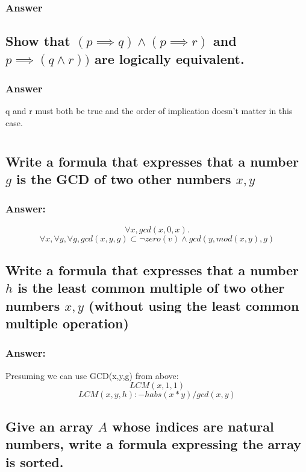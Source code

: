 \documentclass[titlepage]{article}\usepackage[]{graphicx}\usepackage[]{color}
\begin{document}
  \subsubsection{Answer}
  

  \subsection{ Show that $ ( p \implies q ) \land ( p \implies r ) $ and 
              $ p \implies (q \land r))$ are logically equivalent.}
  \subsubsection{Answer}
  q and r must both be true and the order of implication doesn't matter in this
  case. 


  \section{}
  \subsection{Write a formula that expresses that a number $g$ is the GCD of
    two other numbers $x,y$}
  \subsubsection{Answer:}
  \[ \forall x, gcd(x, 0, x). \]
  \[ \forall x, \forall y, \forall g, gcd(x, y, g) ⊂ \lnot zero(v) ∧ gcd(y, mod(x, y), g)  \]

  \subsection{Write a formula that expresses that a number $h$ is the least
    common multiple of two other numbers $x,y$ (without using the least common
    multiple operation)}
  \subsubsection{Answer:}
  Presuming we can use GCD(x,y,g) from above:
  \[ LCM(x,1,1) \] 
  \[ LCM(x,y,h) :- h abs(x*y) / gcd(x,y) \] 


  \subsection{Give an array $A$ whose indices are natural numbers, write a
  formula expressing the array is sorted.}
\end{document}
